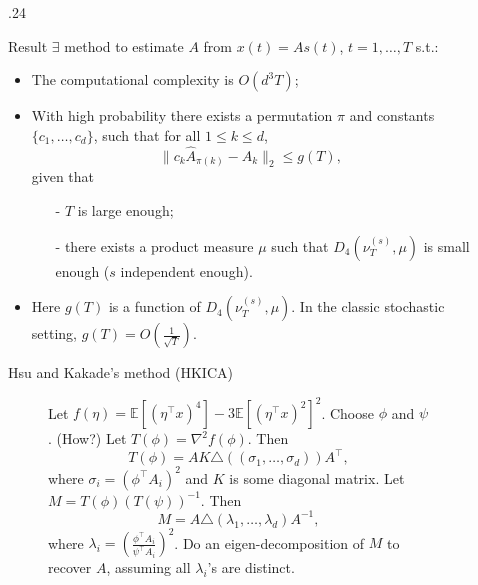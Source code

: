 \documentclass[final]{beamer} %
\newcommand{\EEp}[1]{\mathbb{E}\left[#1\right]}
\begin{document}
\begin{frame}[c]
\begin{columns}[t,totalwidth=\textwidth]
\begin{column}{.24\textwidth}
	\end{column}
	\begin{column}{0.01\textwidth}
	\end{column}
	\begin{column} {.24\textwidth}
		\begin{block}{Result}
			$\exists$ method to estimate $A$ from $x(t)=A s(t)$, $t=1,\dots,T$ s.t.:
			\begin{itemize}
				\item The computational complexity is $O(d^3 T)$;
				\item With high probability there exists a permutation $\pi$ and constants $\{c_1,\ldots,c_d\}$, such that for all $1\le k\le d$, 
				\[\| c_k\hat{A}_{\pi(k)} - A_k\|_2 \le g(T),\]
				given that 
				\begin{itemize}
					\item[-]  $T$ is large enough;
					\item[-]  there exists a product measure $\mu$ such that $D_4(\nu_T^{(s)},\mu)$ is small enough ($s$ independent enough).
				\end{itemize}
				\item Here $g(T)$ is a function of $D_4(\nu_T^{(s)},\mu)$. In the classic stochastic setting, $g(T) = O(\frac{1}{\sqrt{T}})$.
			\end{itemize}
		\end{block}
		\vspace{0.5ex}
		\begin{block}{Hsu and Kakade's method (HKICA)}
			\begin{figure}
			\begin{algorithmic}[1]
				\STATE Let $f(\eta) = \EEp{(\eta^{\top}x)^4} - 3 \EEp{(\eta^{\top}x)^2}^2$.
				\STATE  Choose $\phi$ and $\psi$. (How?)
				\STATE Let $T(\phi) = \nabla^2 f(\phi)$. Then 
					\[T(\phi) = AK \triangle\left( (\sigma_1,\ldots,  \sigma_d)\right)A^{\top},
					\]
					where $\sigma_i = \left(\phi^{\top}A_i\right)^2$ and $K$ is some diagonal matrix.
				\STATE Let $M = T(\phi)(T(\psi))^{-1}$. Then 
					\[M = A \triangle \left( \lambda_1, \ldots, \lambda_d \right) A^{-1},
					\]
					where $\lambda_i = \left(\frac{\phi^{\top}A_i}{\psi^{\top}A_i}\right)^2$.
				\STATE Do an eigen-decomposition of $M$ to recover $A$, assuming all $\lambda_i$'s are distinct.
			\end{algorithmic}

\end{figure}
\end{block}
\end{column}
\end{columns}
\end{frame}
\end{document}
